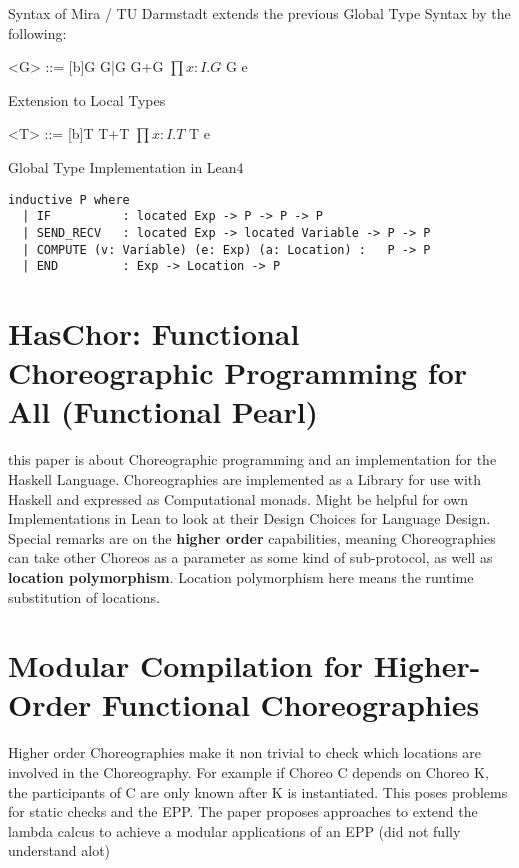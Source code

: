 Syntax of Mira / TU Darmstadt
extends the previous Global Type Syntax by the following:
\begin{grammar}

<G> ::= [b]G
	\alt G|G
	\alt G+G
	\alt $\prod x:I.G$
	\alt G e

\end{grammar}

Extension to Local Types
\begin{grammar}

<T> ::= [b]T
	\alt T+T
	\alt $\prod x:I.T$
	\alt T e

\end{grammar}

Global Type Implementation in Lean4

\begin{lstlisting}[language=lean]
inductive P where
  | IF 			: located Exp -> P -> P -> P
  | SEND_RECV   : located Exp -> located Variable -> P -> P
  | COMPUTE (v: Variable) (e: Exp) (a: Location) :   P -> P
  | END     	: Exp -> Location -> P
\end{lstlisting}

\section{HasChor: Functional Choreographic Programming for All
(Functional Pearl)}
this paper is about Choreographic programming and an implementation for the Haskell Language. Choreographies are implemented as a Library for use with Haskell and expressed as Computational monads. Might be helpful for own Implementations in Lean to look at their Design Choices for Language Design. Special remarks are on the \textbf{higher order} capabilities, meaning Choreographies can take other Choreos as a parameter as some kind of sub-protocol, as well as \textbf{location polymorphism}. Location polymorphism here means the runtime substitution of locations.

\section{Modular Compilation for Higher-Order Functional
Choreographies}
Higher order Choreographies make it non trivial to check which locations are involved in the Choreography. For example if Choreo C depends on Choreo K, the participants of C are only known after K is instantiated. This poses problems for static checks and the EPP. The paper proposes approaches to extend the lambda calcus to achieve a modular applications of an EPP (did not fully understand alot)

